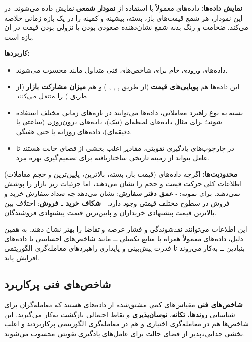 \documentclass[12pt, a4paper]{report}
\begin{document}
\bigskip
\textbf{نمایش داده‌ها:}  
داده‌های  معمولاً با استفاده از \textbf{نمودار شمعی} نمایش داده می‌شوند. در این نمودار، هر شمع قیمت‌های باز، بسته، بیشینه و کمینه را در یک بازه زمانی خلاصه می‌کند. ضخامت و رنگ بدنه شمع نشان‌دهنده صعودی بودن یا نزولی بودن قیمت در آن بازه است.  

\bigskip
\textbf{کاربردها:}
\begin{itemize}
    \item داده‌های  ورودی خام برای شاخص‌های فنی متداول مانند محسوب می‌شوند.  
    \item این داده‌ها هم \textbf{پویایی‌های قیمت} (از طریق , , , ) و هم \textbf{میزان مشارکت بازار} (از طریق ) را منتقل می‌کنند.  
\item بسته به نوع راهبرد معاملاتی، داده‌ها می‌توانند در بازه‌های زمانی مختلف استفاده شوند؛ 
برای مثال داده‌های لحظه‌ای (تیک)، داده‌های درون‌روزی (ساعتی یا دقیقه‌ای)، داده‌های روزانه یا حتی هفتگی.
    \item در چارچوب‌های یادگیری تقویتی، مقادیر  اغلب بخشی از فضای حالت هستند تا عامل بتواند از زمینه تاریخی ساختاریافته برای تصمیم‌گیری بهره ببرد.  
\end{itemize}

\bigskip
\textbf{محدودیت‌ها:}  
اگرچه داده‌های  (قیمت باز، بسته، بالاترین، پایین‌ترین و حجم معاملات) اطلاعات کلی حرکت قیمت و حجم را نشان می‌دهند، اما جزئیات ریز بازار را پوشش نمی‌دهند. برای نمونه:  
- \textbf{عمق دفتر سفارش}: نشان می‌دهد چه تعداد سفارش خرید و فروش در سطوح مختلف قیمتی وجود دارد.  
- \textbf{شکاف خرید ـ فروش}: اختلاف بین بالاترین قیمت پیشنهادی خریداران و پایین‌ترین قیمت پیشنهادی فروشندگان.  

این اطلاعات می‌توانند نقدشوندگی و فشار عرضه و تقاضا را بهتر نشان دهند. به همین دلیل، داده‌های  معمولاً همراه با منابع تکمیلی ــ مانند شاخص‌های احساسی یا داده‌های بنیادین ــ به‌کار می‌روند تا قدرت پیش‌بینی و پایداری راهبردهای معامله‌گری الگوریتمی افزایش یابد.


\subsection{شاخص‌های فنی\protect{} پرکاربرد}

\textbf{شاخص‌های فنی} مقیاس‌های کمی مشتق‌شده از داده‌های  هستند که معامله‌گران برای شناسایی \textbf{روندها}، \textbf{تکانه}، \textbf{نوسان‌پذیری} و نقاط احتمالی بازگشت به‌کار می‌گیرند. این شاخص‌ها هم در معامله‌گری اختیاری و هم در معامله‌گری الگوریتمی پرکاربردند و اغلب بخشی جدایی‌ناپذیر از فضای حالت برای عامل‌های یادگیری تقویتی محسوب می‌شوند.  
\end{document}
